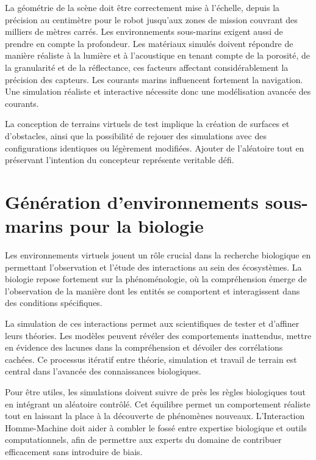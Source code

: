 La géométrie de la scène doit être correctement mise à l'échelle, depuis la précision au centimètre pour le robot jusqu'aux zones de mission couvrant des milliers de mètres carrés. Les environnements sous-marins exigent aussi de prendre en compte la profondeur. Les matériaux simulés doivent répondre de manière réaliste à la lumière et à l'acoustique en tenant compte de la porosité, de la granularité et de la réflectance, ces facteurs affectant considérablement la précision des capteurs.
Les courants marins influencent fortement la navigation. Une simulation réaliste et interactive nécessite donc une modélisation avancée des courants.

La conception de terrains virtuels de test implique la création de surfaces et d'obstacles, ainsi que la possibilité de rejouer des simulations avec des configurations identiques ou légèrement modifiées. Ajouter de l'aléatoire tout en préservant l'intention du concepteur représente veritable défi.

\section*{Génération d'environnements sous-marins pour la biologie}

Les environnements virtuels jouent un rôle crucial dans la recherche biologique en permettant l'observation et l'étude des interactions au sein des écosystèmes. La biologie repose fortement sur la phénoménologie, où la compréhension émerge de l'observation de la manière dont les entités se comportent et interagissent dans des conditions spécifiques.

La simulation de ces interactions permet aux scientifiques de tester et d'affiner leurs théories. Les modèles peuvent révéler des comportements inattendus, mettre en évidence des lacunes dans la compréhension et dévoiler des corrélations cachées. Ce processus itératif entre théorie, simulation et travail de terrain est central dans l'avancée des connaissances biologiques.

Pour être utiles, les simulations doivent suivre de près les règles biologiques tout en intégrant un aléatoire contrôlé. Cet équilibre permet un comportement réaliste tout en laissant la place à la découverte de phénomènes nouveaux. L'Interaction Homme-Machine doit aider à combler le fossé entre expertise biologique et outils computationnels, afin de permettre aux experts du domaine de contribuer efficacement sans introduire de biais.

